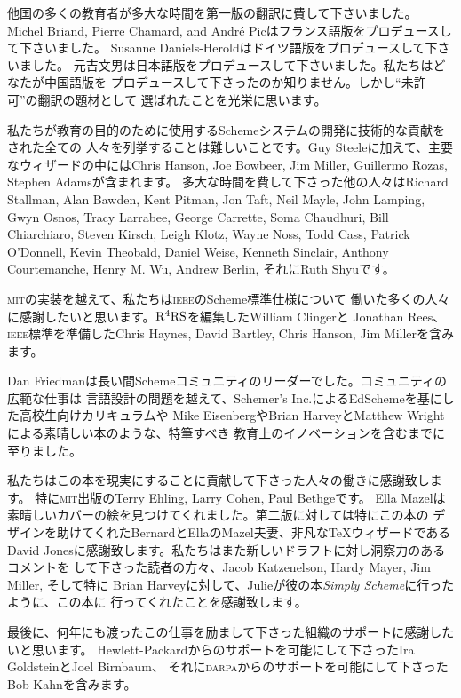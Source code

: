 \documentclass[oneside]{book}
\newcommand{\acronym}[1]{\textsc{\MakeLowercase{#1}}}
\begin{document}
他国の多くの教育者が多大な時間を第一版の翻訳に費して下さいました。
Michel Briand, Pierre Chamard, and Andr\'e Picはフランス語版をプロデュースして下さいました。
Susanne Daniels-Heroldはドイツ語版をプロデュースして下さいました。
元吉文男は日本語版をプロデュースして下さいました。私たちはどなたが中国語版を
プロデュースして下さったのか知りません。しかし``未許可''の翻訳の題材として
選ばれたことを光栄に思います。



私たちが教育の目的のために使用するSchemeシステムの開発に技術的な貢献をされた全ての
人々を列挙することは難しいことです。Guy Steeleに加えて、主要なウィザードの中にはChris Hanson, Joe
Bowbeer, Jim Miller, Guillermo Rozas, Stephen Adamsが含まれます。
多大な時間を費して下さった他の人々はRichard Stallman, Alan Bawden, Kent Pitman, Jon Taft,
Neil Mayle, John Lamping, Gwyn Osnos, Tracy Larrabee, George Carrette, Soma
Chaudhuri, Bill Chiarchiaro, Steven Kirsch, Leigh Klotz, Wayne Noss, Todd Cass,
Patrick O'Donnell, Kevin Theobald, Daniel Weise, Kenneth Sinclair, Anthony
Courtemanche, Henry M. Wu, Andrew Berlin, それにRuth Shyuです。


\acronym{MIT}の実装を越えて、私たちは\acronym{IEEE}のScheme標準仕様について
働いた多くの人々に感謝したいと思います。\( \rm R^4RS \)を編集したWilliam Clingerと
Jonathan Rees、\acronym{IEEE}標準を準備したChris Haynes, David Bartley,
Chris Hanson, Jim Millerを含みます。


Dan Friedmanは長い間Schemeコミュニティのリーダーでした。コミュニティの広範な仕事は
言語設計の問題を越えて、Schemer's Inc.によるEdSchemeを基にした高校生向けカリキュラムや
Mike EisenbergやBrian HarveyとMatthew Wrightによる素晴しい本のような、特筆すべき
教育上のイノベーションを含むまでに至りました。



私たちはこの本を現実にすることに貢献して下さった人々の働きに感謝致します。
特に\acronym{MIT}出版のTerry Ehling, Larry Cohen, Paul Bethgeです。
Ella Mazelは素晴しいカバーの絵を見つけてくれました。第二版に対しては特にこの本の
デザインを助けてくれたBernardとEllaのMazel夫妻、非凡な{\TeX}ウィザードである
David Jonesに感謝致します。私たちはまた新しいドラフトに対し洞察力のあるコメントを
して下さった読者の方々、Jacob Katzenelson, Hardy Mayer, Jim Miller, そして特に
Brian Harveyに対して、Julieが彼の本\textit{Simply Scheme}に行ったように、この本に
行ってくれたことを感謝致します。



最後に、何年にも渡ったこの仕事を励まして下さった組織のサポートに感謝したいと思います。
Hewlett-Packardからのサポートを可能にして下さったIra GoldsteinとJoel Birnbaum、
それに\acronym{DARPA}からのサポートを可能にして下さったBob Kahnを含みます。
\end{document}
